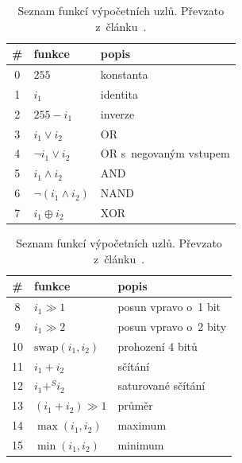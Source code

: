 \begin{table}[htb]
    \caption{Seznam funkcí výpočetních uzlů. Převzato z~článku~\cite{SikuPPSN}.}
    \renewcommand{\arraystretch}{1.2}
    \begin{minipage}[t]{.5\textwidth}
        \small\centering\begin{tabular}{cll}
            \toprule
            \# & funkce & popis \\
            \midrule
            0 & $255$ & konstanta \\
            1 & $i_1$ & identita \\
            2 & $255 - i_1$ & inverze \\
            3 & $i_1 \vee i_2$ & OR \\
            4 & $\neg i_1 \vee i_2$ & OR s~negovaným vstupem \\
            5 & $i_1 \wedge i_2$ & AND \\
            6 & $\neg (i_1 \wedge i_2)$ & NAND \\
            7 & $i_1 \oplus i_2$ & XOR \\
            \bottomrule
        \end{tabular}

    \end{minipage}
    \begin{minipage}[t]{.5\textwidth}
        \small\centering\begin{tabular}{cll}
            \toprule
            \# & funkce & popis \\
            \midrule
            8 & $i_1 \gg 1$ & posun vpravo o~1 bit \\
            9 & $i_1 \gg 2$ & posun vpravo o~2 bity \\
            10 & $\mathrm{swap}(i_1, i_2)$ & prohození 4 bitů \\
            11 & $i_1 + i_2$ & sčítání \\
            12 & $i_1 +^S i_2$ & saturované sčítání \\
            13 & $(i_1 + i_2) \gg 1$ & průměr \\
            14 & $\max(i_1, i_2)$ & maximum \\
            15 & $\min(i_1, i_2)$ & minimum \\
            \bottomrule
        \end{tabular}

    \end{minipage}
    \label{tabCGPFunctions}
\end{table}

